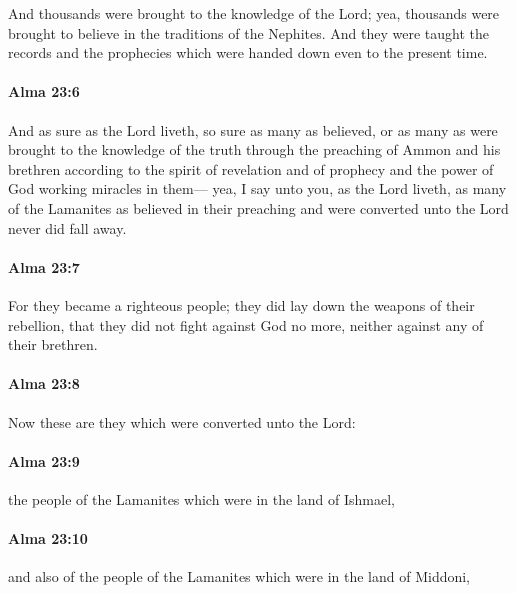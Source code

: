 			And thousands were brought to the knowledge of the Lord;
			yea, thousands were brought to believe in the traditions of the Nephites.
			And they were taught the records and the prophecies
			which were handed down even to the present time.

		\paragraph{Alma 23:6} %
			\label{ALMA-23-6}

			And as sure as the Lord liveth,
			so sure as many as believed,
			or as many as were brought to the knowledge of the truth
			through the preaching of Ammon and his brethren
			according to the spirit of revelation and of prophecy
			and the power of God working miracles in them---
			yea, I say unto you, as the Lord liveth,
			as many of the Lamanites as believed in their preaching
			and were converted unto the Lord
			never did fall away.

		\paragraph{Alma 23:7} %
			\label{ALMA-23-7}

			For they became a righteous people;
			they did lay down the weapons of their rebellion,
			that they did not fight against God no more,
			neither against any of their brethren.

		\paragraph{Alma 23:8} %
			\label{ALMA-23-8}

			Now these are they which were converted unto the Lord:

		\paragraph{Alma 23:9} %
			\label{ALMA-23-9}

			the people of the Lamanites which were in the land of Ishmael,

		\paragraph{Alma 23:10} %
			\label{ALMA-23-10}

			and also of the people of the Lamanites which were in the land of Middoni,

